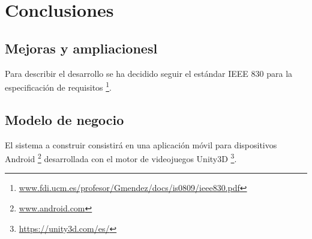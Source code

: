 \chapter{Conclusiones}

\section{Mejoras y ampliacionesl}

Para describir el desarrollo se ha decidido seguir el estándar IEEE 830 para la especificación de requisitos \footnote{\url{www.fdi.ucm.es/profesor/Gmendez/docs/is0809/ieee830.pdf}}.

\section{Modelo de negocio}

El sistema a construir consistirá en una aplicación móvil para dispositivos Android \footnote{\url{www.android.com}} desarrollada con el motor de videojuegos Unity3D \footnote{\url{https://unity3d.com/es/}}. 


